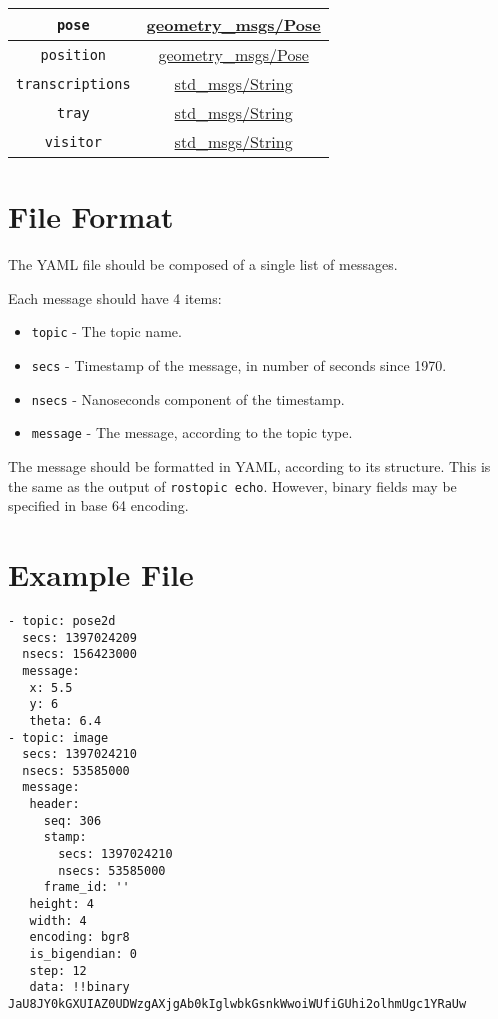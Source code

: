 \documentclass[a4paper]{article}
\begin{document}
\begin{center}
\begin{tabular}{|c|c|}
\verb!pose! & \href{http://docs.ros.org/api/geometry\_msgs/html/msg/Pose.html}{geometry\_msgs/Pose} \\\hline
\verb!position! & \href{http://docs.ros.org/api/geometry\_msgs/html/msg/Pose.html}{geometry\_msgs/Pose} \\\hline
\verb!transcriptions! & \href{http://docs.ros.org/api/std\_msgs/html/msg/String.html}{std\_msgs/String} \\\hline
\verb!tray! & \href{http://docs.ros.org/api/std\_msgs/html/msg/String.html}{std\_msgs/String} \\\hline
\verb!visitor! & \href{http://docs.ros.org/api/std\_msgs/html/msg/String.html}{std\_msgs/String} \\\hline
\end{tabular}
\end{center}


\section{File Format}

The YAML file should be composed of a single list of messages.

Each message should have 4 items:
\begin{itemize}
 \item \verb!topic! - The topic name.
 \item \verb!secs! - Timestamp of the message, in number of seconds since 1970.
 \item \verb!nsecs! - Nanoseconds component of the timestamp.
 \item \verb!message! - The message, according to the topic type.
\end{itemize}

The message should be formatted in YAML, according to its structure. This is the same as the output of \verb!rostopic echo!. However, binary fields may be specified in
base 64 encoding.


\section{Example File}

\begin{verbatim}
- topic: pose2d
  secs: 1397024209
  nsecs: 156423000
  message:
   x: 5.5
   y: 6
   theta: 6.4
- topic: image
  secs: 1397024210
  nsecs: 53585000
  message:
   header:
     seq: 306
     stamp:
       secs: 1397024210
       nsecs: 53585000
     frame_id: ''
   height: 4
   width: 4
   encoding: bgr8
   is_bigendian: 0
   step: 12
   data: !!binary JaU8JY0kGXUIAZ0UDWzgAXjgAb0kIglwbkGsnkWwoiWUfiGUhi2olhmUgc1YRaUw
\end{verbatim}
\end{document}
